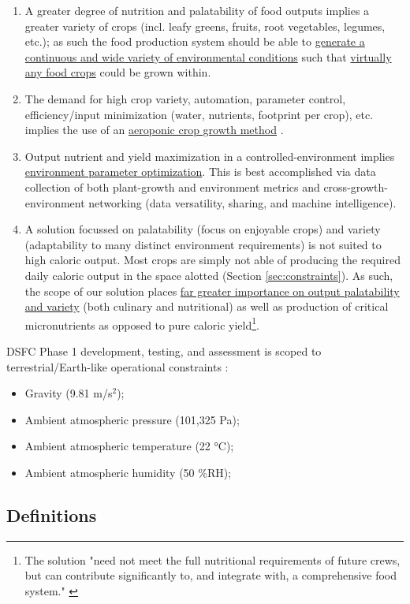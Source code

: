 \documentclass{report}
\begin{document}
\begin{enumerate}[label=SC\arabic*., ref=SC\arabic*]
\newpage
\item \label{sc:5} A greater degree of nutrition and palatability of food outputs implies a greater variety of crops (incl. leafy greens, fruits, root vegetables, legumes, etc.); as such the food production system should be able to \uline{generate a continuous and wide variety of environmental conditions} such that \uline{virtually any food crops} could be grown within.
\item \label{sc:6} The demand for high crop variety, automation, parameter control, efficiency/input minimization (water, nutrients, footprint per crop), etc. implies the use of an \uline{aeroponic crop growth method} \cite{spinoff}.
\item \label{sc:7} Output nutrient and yield maximization in a controlled-environment implies \uline{environment parameter optimization}. 
    This is best accomplished via data collection of both plant-growth and environment metrics and cross-growth-environment networking (data versatility, sharing, and machine intelligence).
\item \label{sc:8} A solution focussed on palatability (focus on enjoyable crops) and variety (adaptability to many distinct environment requirements) is not suited to high caloric output. 
    Most crops are simply not able of producing the required daily caloric output in the space alotted (Section \ref{sec:constraints}). 
    As such, the scope of our solution places \uline{far greater importance on output palatability and variety} (both culinary and nutritional) as well as production of critical micronutrients as opposed to pure caloric 
    yield\footnote{The solution "need not meet the full nutritional requirements of future crews, but can contribute significantly to, and integrate with, a comprehensive food system." \cite{applicantguide}}.
\end{enumerate}
DSFC Phase 1 development, testing, and assessment is scoped to terrestrial/Earth-like operational constraints \cite{applicantguide,dsfc-phase2}:
\begin{itemize}
    \item Gravity (9.81 m/s${}^2$);
    \item Ambient atmospheric pressure (101,325 Pa);
    \item Ambient atmospheric temperature (22 °C);
    \item Ambient atmospheric humidity (50 \%RH);
\end{itemize}

\newpage
\subsection{Definitions}
\label{sec:definitions}
\end{document}
